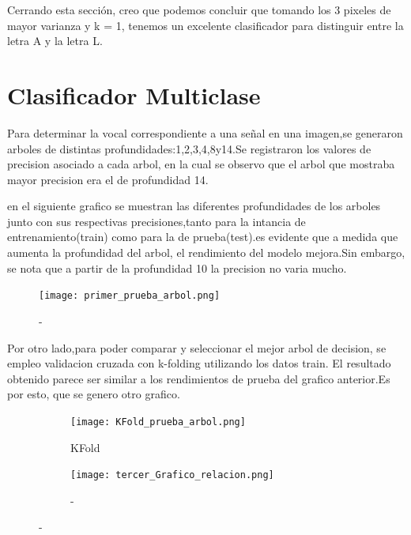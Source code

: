 \documentclass[10pt,a4paper]{article}
\begin{document}
\vspace{0.05cm}

Cerrando esta sección, creo que podemos concluir que tomando los 3 pixeles de mayor varianza y k = 1, tenemos un excelente clasificador para distinguir entre la letra A y la letra L.


\section{Clasificador Multiclase}
\vspace{0.05cm}
Para determinar la vocal correspondiente a una señal en una imagen,se generaron arboles de distintas profundidades:1,2,3,4,8y14.Se registraron los valores de precision asociado a cada arbol, en la cual se observo que el arbol que mostraba mayor precision era el de profundidad 14.

en el siguiente grafico se muestran las diferentes profundidades de los arboles junto con sus respectivas precisiones,tanto para la intancia de entrenamiento(train) como para la de prueba(test).es evidente que a medida que aumenta la profundidad del arbol, el rendimiento del modelo mejora.Sin embargo, se nota que a partir de la profundidad 10 la precision no varia mucho.

\begin{figure}[h]
  \centering
  \texttt{[image: primer\_prueba\_arbol.png]}
  \caption{-}
  \label{fig:Tabla 1}
\end{figure}

\vspace{0.05cm}

Por otro lado,para poder comparar y seleccionar el mejor arbol de decision, se empleo validacion cruzada con k-folding utilizando los datos  train. El resultado obtenido parece ser similar a los rendimientos de prueba del grafico anterior.Es por esto, que se genero otro grafico.


\begin{figure}[ht!]
	\begin{subfigure}{0.5\textwidth}
		\texttt{[image: KFold\_prueba\_arbol.png]} 
		\caption{KFold}
		\label{fig:subfig1}
	\end{subfigure}
	\begin{subfigure}{0.5\textwidth}
		\texttt{[image: tercer\_Grafico\_relacion.png]}
		\caption{-}
		\label{fig:subfig2}
	\end{subfigure}
	\label{fig:subfigs}
\end{figure}
\end{document}
